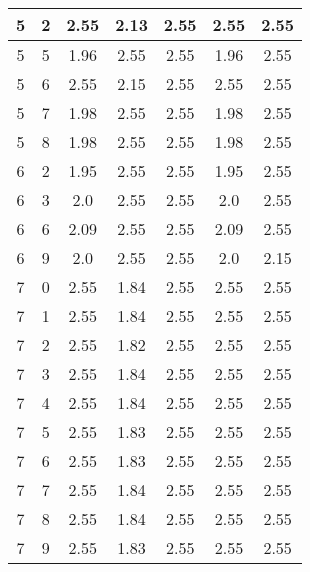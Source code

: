 \begin{longtable}{|c|c||c||c|c||c|c|}
	5 & 2 & 2.55 & 2.13 & 2.55 & 2.55 & 2.55 \\ \hline
	5 & 5 & 1.96 & 2.55 & 2.55 & 1.96 & 2.55 \\ \hline
	5 & 6 & 2.55 & 2.15 & 2.55 & 2.55 & 2.55 \\ \hline
	5 & 7 & 1.98 & 2.55 & 2.55 & 1.98 & 2.55 \\ \hline
	5 & 8 & 1.98 & 2.55 & 2.55 & 1.98 & 2.55 \\ \hline
	6 & 2 & 1.95 & 2.55 & 2.55 & 1.95 & 2.55 \\ \hline
	6 & 3 & 2.0 & 2.55 & 2.55 & 2.0 & 2.55 \\ \hline
	6 & 6 & 2.09 & 2.55 & 2.55 & 2.09 & 2.55 \\ \hline
	6 & 9 & 2.0 & 2.55 & 2.55 & 2.0 & 2.15 \\ \hline
	7 & 0 & 2.55 & 1.84 & 2.55 & 2.55 & 2.55 \\ \hline
	7 & 1 & 2.55 & 1.84 & 2.55 & 2.55 & 2.55 \\ \hline
	7 & 2 & 2.55 & 1.82 & 2.55 & 2.55 & 2.55 \\ \hline
	7 & 3 & 2.55 & 1.84 & 2.55 & 2.55 & 2.55 \\ \hline
	7 & 4 & 2.55 & 1.84 & 2.55 & 2.55 & 2.55 \\ \hline
	7 & 5 & 2.55 & 1.83 & 2.55 & 2.55 & 2.55 \\ \hline
	7 & 6 & 2.55 & 1.83 & 2.55 & 2.55 & 2.55 \\ \hline
	7 & 7 & 2.55 & 1.84 & 2.55 & 2.55 & 2.55 \\ \hline
	7 & 8 & 2.55 & 1.84 & 2.55 & 2.55 & 2.55 \\ \hline
	7 & 9 & 2.55 & 1.83 & 2.55 & 2.55 & 2.55 \\ \hline
\end{longtable}
\clearpage{}
